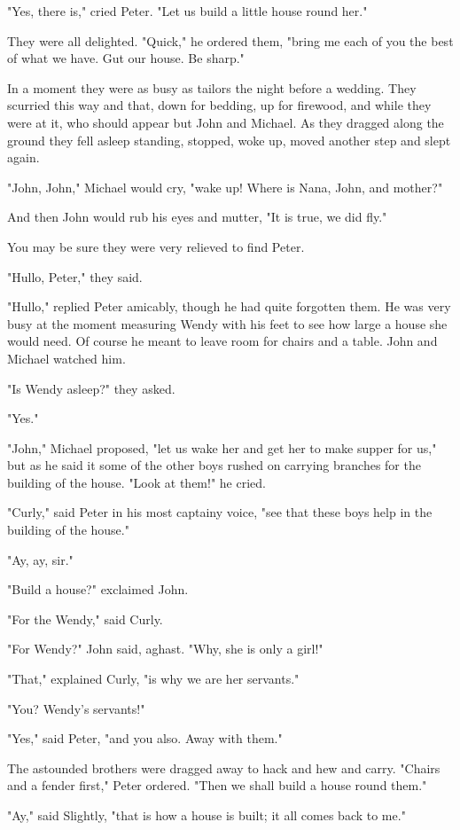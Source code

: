 "Yes, there is," cried Peter.
"Let us build a little house round her."

They were all delighted.
"Quick," he ordered them, "bring me each of you the best of what we have.
Gut our house.
Be sharp."

In a moment they were as busy as tailors the night before a wedding.
They scurried this way and that, down for bedding, up for firewood, and while they were at it, who should appear but John and Michael.
As they dragged along the ground they fell asleep standing, stopped, woke up, moved another step and slept again.

"John, John," Michael would cry, "wake up!
Where is Nana, John, and mother?"

And then John would rub his eyes and mutter, "It is true, we did fly."

You may be sure they were very relieved to find Peter.

"Hullo, Peter," they said.

"Hullo," replied Peter amicably, though he had quite forgotten them.
He was very busy at the moment measuring Wendy with his feet to see how large a house she would need.
Of course he meant to leave room for chairs and a table.
John and Michael watched him.

"Is Wendy asleep?\@" they asked.

"Yes."

"John," Michael proposed, "let us wake her and get her to make supper for us," but as he said it some of the other boys rushed on carrying branches for the building of the house.
"Look at them!\@" he cried.

"Curly," said Peter in his most captainy voice, "see that these boys help in the building of the house."

"Ay, ay, sir."

"Build a house?\@" exclaimed John.

"For the Wendy," said Curly.

"For Wendy?\@" John said, aghast.
"Why, she is only a girl!"

"That," explained Curly, "is why we are her servants."

"You?
Wendy's servants!"

"Yes," said Peter, "and you also.
Away with them."

The astounded brothers were dragged away to hack and hew and carry.
"Chairs and a fender first," Peter ordered.
"Then we shall build a house round them."

"Ay," said Slightly, "that is how a house is built;
it all comes back to me."

